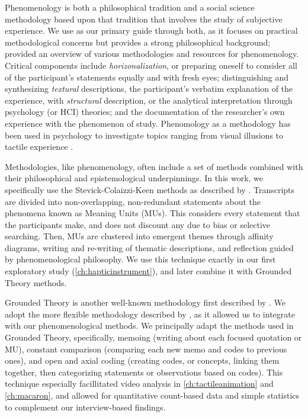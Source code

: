 Phenomenology is both a philosophical tradition and a social science methodology based upon that tradition that involves the study of subjective experience.
We use \citet{Moustakas1994} as our primary guide through both, as it focuses on practical methodological concerns but provides a strong philosophical background; \citet{Creswell2013} provided an overview of various methodologies and resources for phenomenology.
Critical components include \emph{horizonalization}, or preparing oneself to consider all of the participant's statements equally and with fresh eyes; distinguishing and synthesizing \emph{textural} descriptions, \eg the participant's verbatim explanation of the experience, with \emph{structural} description, or the analytical interpretation through psychology (or HCI) theories; and the documentation of the researcher's own experience with the phenomenon of study.
Phenomology as a methodology has been used in psychology to investigate topics ranging from visual illusions to tactile experience \cite{Richer1978, Obrist2013, Creswell2013}.

Methodologies, like phenomenology, often include a set of methods combined with their philosophical and epistemological underpinnings.
In this work, we specifically use the Stevick-Colaizzi-Keen methods as described by \citet{Moustakas1994}.
Transcripts are divided into non-overlapping, non-redundant statements about the phenomena known as Meaning Units (MUs).
This considers every statement that the participants make, and does not discount any due to bias or selective searching.
Then, MUs are clustered into emergent themes through affinity diagrams, writing and re-writing of thematic descriptions, and reflection guided by phenomenological philosophy.
We use this technique exactly in our first exploratory study (\autoref{ch:hapticinstrument}), and later combine it with Grounded Theory methods.

Grounded Theory is another well-known methodology first described by \citet{glaser1966awareness}.
We adopt the more flexible methodology described by \citet{Corbin2008}, as it allowed us to integrate with our phenomenological methods.
We principally adapt the methods used in Grounded Theory, specifically, memoing (writing about each focused quotation or MU), constant comparison (comparing each new memo and codes to previous ones), and open and axial coding (creating codes, or concepts, linking them together, then categorizing statements or observations based on codes).
This technique especially facillitated video analysis in \autoref{ch:tactileanimation} and \autoref{ch:macaron}, and allowed for quantitative count-based data and simple statistics to complement our interview-based findings.

